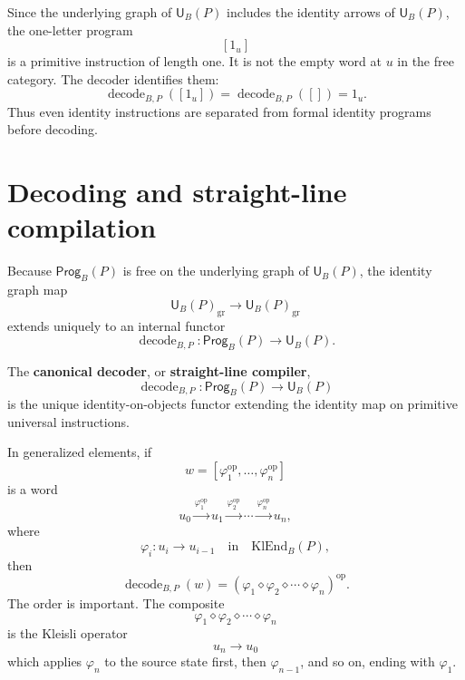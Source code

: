 \begin{remark}
Since the underlying graph of \(\mathsf U_B(P)\) includes the identity arrows of
\(\mathsf U_B(P)\), the one-letter program
\[
        [1_u]
\]
is a primitive instruction of length one.  It is not the empty word at \(u\) in the free category.
The decoder identifies them:
\[
        \operatorname{decode}_{B,P}([1_u])
        =
        \operatorname{decode}_{B,P}([])
        =
        1_u.
\]
Thus even identity instructions are separated from formal identity programs before decoding.
\end{remark}

\section{Decoding and straight-line compilation}
\label{sec:decoding-straight-line-compilation}

Because \(\mathsf{Prog}_B(P)\) is free on the underlying graph of \(\mathsf U_B(P)\), the identity
graph map
\[
        \mathsf U_B(P)_{\mathrm{gr}}
        \longrightarrow
        \mathsf U_B(P)_{\mathrm{gr}}
\]
extends uniquely to an internal functor
\[
        \operatorname{decode}_{B,P}:
        \mathsf{Prog}_B(P)\longrightarrow\mathsf U_B(P).
\]

\begin{definition}
The \textbf{canonical decoder}, or \textbf{straight-line compiler},
\[
        \operatorname{decode}_{B,P}:
        \mathsf{Prog}_B(P)\longrightarrow\mathsf U_B(P)
\]
is the unique identity-on-objects functor extending the identity map on primitive universal
instructions.
\end{definition}

In generalized elements, if
\[
        w=
        [\varphi_1^{\operatorname{op}},\ldots,\varphi_n^{\operatorname{op}}]
\]
is a word
\[
        u_0
        \xrightarrow{\varphi_1^{\operatorname{op}}}
        u_1
        \xrightarrow{\varphi_2^{\operatorname{op}}}
        \cdots
        \xrightarrow{\varphi_n^{\operatorname{op}}}
        u_n ,
\]
where
\[
        \varphi_i:u_i\to u_{i-1}
        \quad\text{in}\quad
        \mathrm{KlEnd}_B(P),
\]
then
\[
        \operatorname{decode}_{B,P}(w)
        =
        (\varphi_1\diamond\varphi_2\diamond\cdots\diamond\varphi_n)^{\operatorname{op}}.
\]
The order is important.  The composite
\[
        \varphi_1\diamond\varphi_2\diamond\cdots\diamond\varphi_n
\]
is the Kleisli operator
\[
        u_n\longrightarrow u_0
\]
which applies \(\varphi_n\) to the source state first, then \(\varphi_{n-1}\), and so on, ending
with \(\varphi_1\).

